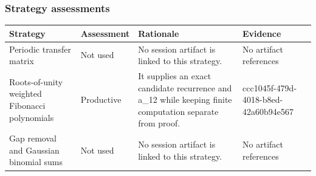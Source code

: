 \documentclass[11pt]{article}
\begin{document}
\subsubsection*{Strategy assessments}
\begin{longtable}{>{\raggedright\arraybackslash}p{.16\linewidth}>{\raggedright\arraybackslash}p{.15\linewidth}>{\raggedright\arraybackslash}p{.40\linewidth}>{\raggedright\arraybackslash}p{.17\linewidth}}
\toprule Strategy & Assessment & Rationale & Evidence \\
\midrule\endhead
Periodic transfer matrix & Not used & No session artifact is linked to this strategy. & No artifact references \\
Roots-of-unity weighted Fibonacci polynomials & Productive & It supplies an exact candidate recurrence and a\_12 while keeping finite computation separate from proof. & ccc1045f-479d-4018-b8ed-42a60b94e567 \\
Gap removal and Gaussian binomial sums & Not used & No session artifact is linked to this strategy. & No artifact references \\
\bottomrule
\end{longtable}
\end{document}
